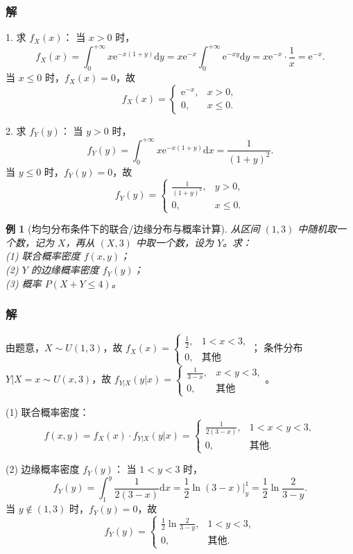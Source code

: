 \documentclass[11pt,a4paper,oneside,openany]{book}
\theoremstyle{yhbthm}
\newtheorem{example}{例}[section]
\begin{document}
\subsubsection{解}
1. 求 $f_X(x)$：
当 $x > 0$ 时，
\[
f_X(x) = \int_{0}^{+\infty} x \mathrm{e}^{-x(1+y)} \mathrm{d}y = x\mathrm{e}^{-x} \int_{0}^{+\infty} \mathrm{e}^{-xy} \mathrm{d}y = x\mathrm{e}^{-x} \cdot \frac{1}{x} = \mathrm{e}^{-x}.
\]
当 $x \le 0$ 时，$f_X(x) = 0$，故
\[
f_X(x) = \begin{cases} \mathrm{e}^{-x}, & x>0, \\ 0, & x\le0. \end{cases}
\]

2. 求 $f_Y(y)$：
当 $y > 0$ 时，
\[
f_Y(y) = \int_{0}^{+\infty} x \mathrm{e}^{-x(1+y)} \mathrm{d}x = \frac{1}{(1+y)^2}.
\]
当 $y \le 0$ 时，$f_Y(y) = 0$，故
\[
f_Y(y) = \begin{cases} \displaystyle \frac{1}{(1+y)^2}, & y>0, \\ 0, & x\le0. \end{cases}
\]

\begin{example}[均匀分布条件下的联合/边缘分布与概率计算]
从区间 $(1,3)$ 中随机取一个数，记为 $X$，再从 $(X,3)$ 中取一个数，设为 $Y$。求：\\
(1) 联合概率密度 $f(x,y)$；\\
(2) $Y$ 的边缘概率密度 $f_Y(y)$；\\
(3) 概率 $P(X + Y \leq 4)$。
\end{example}

\subsubsection{解}
由题意，$X \sim U(1,3)$，故 $f_X(x) = \begin{cases} \frac{1}{2}, & 1<x<3, \\ 0, & \text{其他} \end{cases}$；
条件分布 $Y|X=x \sim U(x,3)$，故 $f_{Y|X}(y|x) = \begin{cases} \frac{1}{3-x}, & x<y<3, \\ 0, & \text{其他} \end{cases}$。

(1) 联合概率密度：
\[
f(x,y) = f_X(x) \cdot f_{Y|X}(y|x) = \begin{cases} \frac{1}{2(3-x)}, & 1<x<y<3, \\ 0, & \text{其他}. \end{cases}
\]

(2) 边缘概率密度 $f_Y(y)$：
当 $1<y<3$ 时，
\[
f_Y(y) = \int_{1}^{y} \frac{1}{2(3-x)} \mathrm{d}x = \frac{1}{2} \left. \ln(3-x) \right|_{y}^{1} = \frac{1}{2} \ln \frac{2}{3-y}.
\]
当 $y \notin (1,3)$ 时，$f_Y(y) = 0$，故
\[
f_Y(y) = \begin{cases} \frac{1}{2} \ln \frac{2}{3-y}, & 1<y<3, \\ 0, & \text{其他}. \end{cases}
\]
\end{document}
